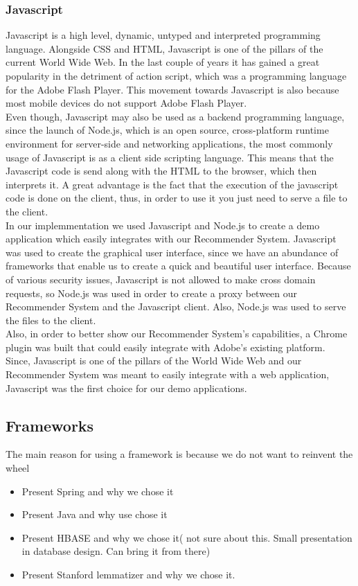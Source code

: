 \subsubsection{Javascript}
\label{sec:programming-languages-javascript}
Javascript is a high level, dynamic, untyped and interpreted programming language. Alongside CSS and HTML, Javascript is one of the pillars of the current World Wide Web. In the last couple of years it has gained a great popularity in the detriment of action script, which was a programming language for the Adobe Flash Player. This movement towards Javascript is also because most mobile devices do not support Adobe Flash Player.
\\ Even though, Javascript may also be used as a backend programming language, since the launch of Node.js, which is  an open source, cross-platform runtime environment for server-side and networking applications, the most commonly usage of Javascript is as a client side scripting language. This means that the Javascript code is send along with the HTML to the browser, which then interprets it. A great advantage is the fact that the execution of the javascript code is done on the client, thus, in order to use it you just need to serve a file to the client.
\\ In our implemmentation we used Javascript and Node.js to create a demo application which easily integrates with our Recommender System. Javascript was used to create the graphical user interface, since we have an abundance of frameworks that enable us to create a quick and beautiful user interface. Because of various security issues, Javascript is not allowed to make cross domain requests, so Node.js was used in order to create a proxy between our Recommender System and the Javascript client. Also, Node.js was used to serve the files to the client.
\\ Also, in order to better show our Recommender System's capabilities, a Chrome plugin was built that could easily integrate with Adobe's existing platform.
\\ Since, Javascript is one of the pillars of the World Wide Web and our Recommender System was meant to easily integrate with a web application, Javascript was the first choice for our demo applications.


\subsection{Frameworks}
\label{sec:frameworks}
The main reason for using a framework is because we do not want to reinvent the wheel
\begin{itemize}
	\item Present Spring and why we chose it	
	\item Present Java and why use chose it
	\item Present HBASE and why we chose it( not sure about this. Small presentation in database design. Can bring it from there)
	\item Present Stanford lemmatizer and why we chose it.	
\end{itemize}


